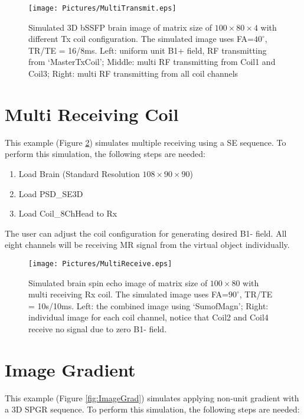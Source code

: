 \documentclass{book}%
\begin{document}
\begin{figure}[htbp]
	\centering
		\texttt{[image: Pictures/MultiTransmit.eps]}
	\caption{Simulated 3D bSSFP brain image of matrix size of $100 \times 80 \times 4$ with different Tx coil configuration. The simulated image uses FA=$40^{\circ}$, TR/TE = 16/8ms. Left: uniform unit B1+ field, RF transmitting from `MasterTxCoil'; Middle: multi RF transmitting from Coil1 and Coil3; Right: multi RF transmitting from all coil channels}
	\label{fig:MultiTransmit}
\end{figure}

\section{Multi Receiving Coil}

This example (Figure \ref{fig:MultiReceive}) simulates multiple receiving using a SE sequence. To perform this simulation, the following steps are needed:

\begin{enumerate}
	\item Load Brain (Standard Resolution $108 \times 90 \times 90$)
  \item Load PSD\_SE3D
	\item Load Coil\_8ChHead to Rx
\end{enumerate}

The user can adjust the coil configuration for generating desired B1- field. All eight channels will be receiving MR signal from the virtual object individually.

\begin{figure}[htbp]
	\centering
		\texttt{[image: Pictures/MultiReceive.eps]}
	\caption{Simulated brain spin echo image of matrix size of $100 \times 80$ with multi receiving Rx coil. The simulated image uses FA=$90^{\circ}$, TR/TE = 10s/10ms. Left: the combined image using `SumofMagn'; Right: individual image for each coil channel, notice that Coil2 and Coil4 receive no signal due to zero B1- field.}
	\label{fig:MultiReceive}
\end{figure}


\section{Image Gradient}

This example (Figure \ref{fig:ImageGrad}) simulates applying non-unit gradient with a 3D SPGR sequence. To perform this simulation, the following steps are needed:
\end{document}
